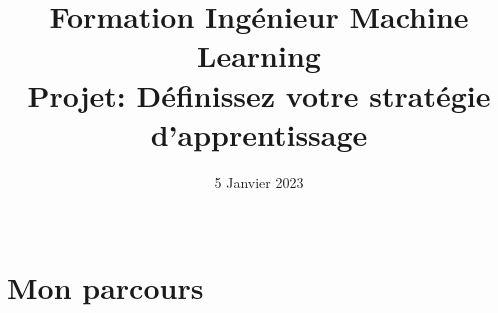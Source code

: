\documentclass[8pt,xcolor=pdftex,table]{beamer}
\title[]{\vspace{22mm}Formation \alert{Ingénieur Machine Learning}\\\vspace{6mm}Projet: Définissez votre \alert{stratégie d'apprentissage}}
\date[]{5 Janvier 2023\\\vspace{18mm}\\\tit{thomas.durandtexte@protonmail.com}}
\begin{document}







\section{Mon \alert{parcours}}


\end{document}
